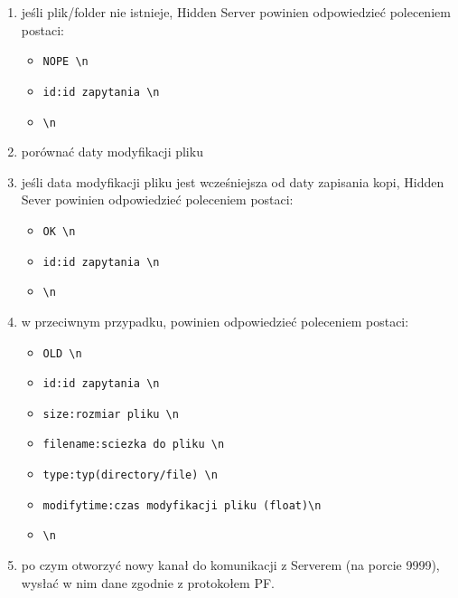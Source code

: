 \documentclass[a4paper,notitlepage]{article}
\begin{document}
\begin{enumerate}
    \item jeśli plik/folder nie istnieje, Hidden Server powinien odpowiedzieć poleceniem postaci:
    \begin{itemize}   
        \item \texttt{NOPE \textbackslash n}
        \item \texttt{id:id zapytania \textbackslash n}
        \item \texttt{\textbackslash n}
    \end{itemize}
    \item porównać daty modyfikacji pliku 
    \item jeśli data modyfikacji pliku jest wcześniejsza od daty zapisania kopi, Hidden Sever powinien odpowiedzieć poleceniem postaci:
    \begin{itemize}
        \item \texttt{OK \textbackslash n}
        \item \texttt{id:id zapytania \textbackslash n}
        \item \texttt{\textbackslash n}
    \end{itemize}
    \item w przeciwnym przypadku, powinien odpowiedzieć poleceniem postaci:
    \begin{itemize}
        \item \texttt{OLD \textbackslash n}
        \item \texttt{id:id zapytania \textbackslash n}
        \item \texttt{size:rozmiar pliku \textbackslash n}
        \item \texttt{filename:sciezka do pliku \textbackslash n}
        \item \texttt{type:typ(directory/file) \textbackslash n}
        \item \texttt{modifytime:czas modyfikacji pliku (float)\textbackslash n}
        \item \texttt{\textbackslash n}
    \end{itemize}
    \item po czym otworzyć nowy kanał do komunikacji z Serverem (na porcie 9999), wysłać w nim dane zgodnie z protokołem PF.
\end{enumerate}
\end{document}
